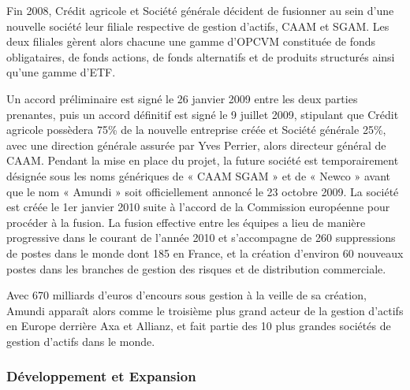 \par Fin 2008, Crédit agricole et Société générale décident de fusionner au sein d'une nouvelle société leur filiale respective de gestion d'actifs, CAAM et SGAM. Les deux filiales gèrent alors chacune une gamme d'OPCVM constituée de fonds obligataires, de fonds actions, de fonds alternatifs et de produits structurés ainsi qu'une gamme d'ETF.
\par Un accord préliminaire est signé le 26 janvier 2009 entre les deux parties prenantes, puis un accord définitif est signé le 9 juillet 2009, stipulant que Crédit agricole possèdera 75\% de la nouvelle entreprise créée et Société générale 25\%, avec une direction générale assurée par Yves Perrier, alors directeur général de CAAM. Pendant la mise en place du projet, la future société est temporairement désignée sous les noms génériques de « CAAM SGAM » et de « Newco » avant que le nom « Amundi » soit officiellement annoncé le 23 octobre 2009. La société est créée le 1er janvier 2010 suite à l'accord de la Commission européenne pour procéder à la fusion. La fusion effective entre les équipes a lieu de manière progressive dans le courant de l'année 2010 et s'accompagne de 260 suppressions de postes dans le monde dont 185 en France, et la création d'environ 60 nouveaux postes dans les branches de gestion des risques et de distribution commerciale.
\par Avec 670 milliards d'euros d'encours sous gestion à la veille de sa création, Amundi apparaît alors comme le troisième plus grand acteur de la gestion d'actifs en Europe derrière Axa et Allianz, et fait partie des 10 plus grandes sociétés de gestion d'actifs dans le monde.

\subsubsection{Développement et Expansion}

